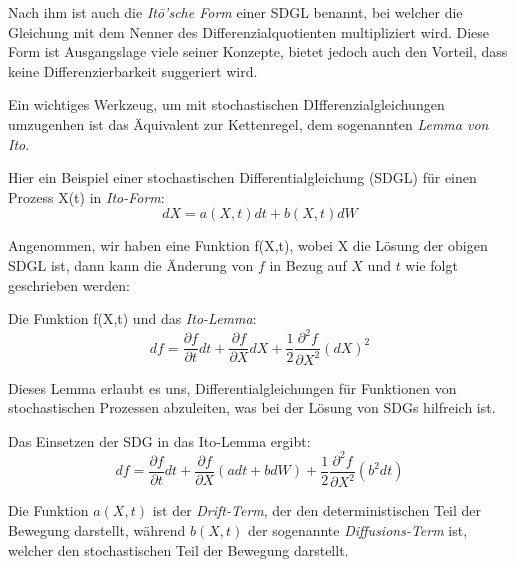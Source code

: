 Nach ihm ist auch die \textit{Itō'sche Form} einer SDGL benannt, bei welcher die Gleichung mit dem Nenner des Differenzialquotienten multipliziert wird. Diese Form ist Ausgangslage viele seiner Konzepte, bietet jedoch auch den Vorteil, dass keine Differenzierbarkeit suggeriert wird.

Ein wichtiges Werkzeug, um mit stochastischen DIfferenzialgleichungen umzugenhen ist das Äquivalent zur Kettenregel, dem sogenannten \textit{Lemma von Ito}. %


Hier ein Beispiel einer stochastischen Differentialgleichung (SDGL) für einen Prozess X(t) in \textit{Ito-Form}:
\begin{equation}
	dX = a(X,t) dt + b(X,t) dW
\end{equation}


Angenommen, wir haben eine Funktion f(X,t), wobei X die Lösung der obigen SDGL ist, dann kann die Änderung von $ f $ in Bezug auf $ X $ und $ t $ wie folgt geschrieben werden:

Die Funktion f(X,t) und das \textit{Ito-Lemma}:
\begin{equation}
	df = \frac{\partial f}{\partial t} dt + \frac{\partial f}{\partial X} dX + \frac{1}{2} \frac{\partial^2 f}{\partial X^2} (dX)^2	
\end{equation}

Dieses Lemma erlaubt es uns, Differentialgleichungen für Funktionen von stochastischen Prozessen abzuleiten, was bei der Lösung von SDGs hilfreich ist.


Das Einsetzen der SDG in das Ito-Lemma ergibt:
\begin{equation}
	df = \frac{\partial f}{\partial t} dt + \frac{\partial f}{\partial X} (a dt + b dW) + \frac{1}{2} \frac{\partial^2 f}{\partial X^2} (b^2 dt)
\end{equation}

Die Funktion $ a(X,t) $ ist der \textit{Drift-Term}, der den deterministischen Teil der Bewegung darstellt, während $ b(X,t) $ der sogenannte \textit{Diffusions-Term} ist, welcher den stochastischen Teil der Bewegung darstellt.


